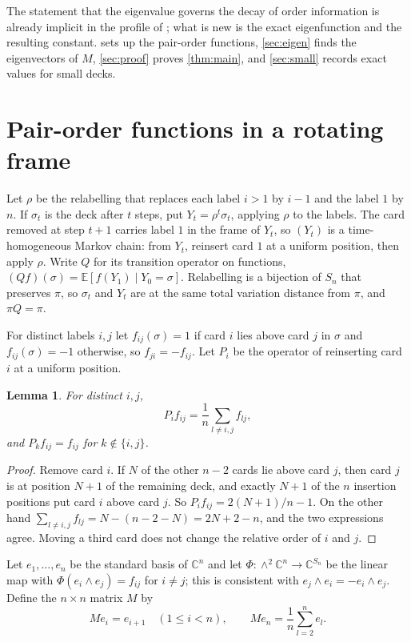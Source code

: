 \documentclass[11pt,a4paper]{article}
\numberwithin{equation}{section}
\newtheorem{lemma}[theorem]{Lemma}
\theoremstyle{remark}
\newcommand{\E}{\mathbb E}
\newcommand{\C}{\mathbb C}
\begin{document}
The statement that the eigenvalue governs the decay of order information is already implicit in the profile of \cite{MNP}; what is new is the exact eigenfunction and the resulting constant.  sets up the pair-order functions, \cref{sec:eigen} finds the eigenvectors of $M$, \cref{sec:proof} proves \cref{thm:main}, and \cref{sec:small} records exact values for small decks.

\section{Pair-order functions in a rotating frame}\label{sec:frame}

Let $\rho$ be the relabelling that replaces each label $i>1$ by $i-1$ and the label $1$ by $n$. If $\sigma_t$ is the deck after $t$ steps, put $Y_t=\rho^t\sigma_t$, applying $\rho$ to the labels. The card removed at step $t+1$ carries label $1$ in the frame of $Y_t$, so $(Y_t)$ is a time-homogeneous Markov chain: from $Y_t$, reinsert card $1$ at a uniform position, then apply $\rho$. Write $Q$ for its transition operator on functions, $(Qf)(\sigma)=\E[f(Y_1)\mid Y_0=\sigma]$. Relabelling is a bijection of $S_n$ that preserves $\pi$, so $\sigma_t$ and $Y_t$ are at the same total variation distance from $\pi$, and $\pi Q=\pi$.

For distinct labels $i,j$ let $f_{ij}(\sigma)=1$ if card $i$ lies above card $j$ in $\sigma$ and $f_{ij}(\sigma)=-1$ otherwise, so $f_{ji}=-f_{ij}$. Let $P_i$ be the operator of reinserting card $i$ at a uniform position.

\begin{lemma}\label{lem:insert}
For distinct $i,j$,
\[
P_if_{ij}=\frac1n\sum_{l\ne i,j}f_{lj},
\]
and $P_kf_{ij}=f_{ij}$ for $k\notin\{i,j\}$.
\end{lemma}

\begin{proof}
Remove card $i$. If $N$ of the other $n-2$ cards lie above card $j$, then card $j$ is at position $N+1$ of the remaining deck, and exactly $N+1$ of the $n$ insertion positions put card $i$ above card $j$. So $P_if_{ij}=2(N+1)/n-1$. On the other hand $\sum_{l\ne i,j}f_{lj}=N-(n-2-N)=2N+2-n$, and the two expressions agree. Moving a third card does not change the relative order of $i$ and $j$.
\end{proof}

Let $e_1,\dots,e_n$ be the standard basis of $\C^n$ and let $\Phi:\wedge^2\C^n\to\C^{S_n}$ be the linear map with $\Phi(e_i\wedge e_j)=f_{ij}$ for $i\ne j$; this is consistent with $e_j\wedge e_i=-e_i\wedge e_j$. Define the $n\times n$ matrix $M$ by
\begin{equation}\label{eq:M}
Me_i=e_{i+1}\quad(1\le i<n),\qquad Me_n=\frac1n\sum_{l=2}^ne_l .
\end{equation}
\end{document}
